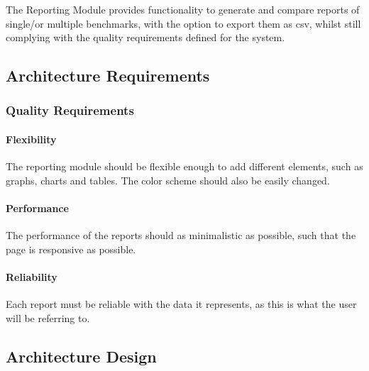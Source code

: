 The Reporting Module provides functionality to generate and compare reports
of single/or multiple benchmarks, with the option to export them as csv,
whilst still complying with the quality requirements defined for the system.

\subsection{Architecture Requirements}
\subsubsection{Quality Requirements}
\paragraph*{Flexibility}
The reporting module should be flexible enough to add different elements,
such as graphs, charts and tables. The color scheme should also be easily
changed.

\paragraph*{Performance}
The performance of the reports should as minimalistic as possible, such that the
page is responsive as possible.

\paragraph*{Reliability}
Each report must be reliable with the data it represents, as this is what the
user will be referring to.



\subsection{Architecture Design}
